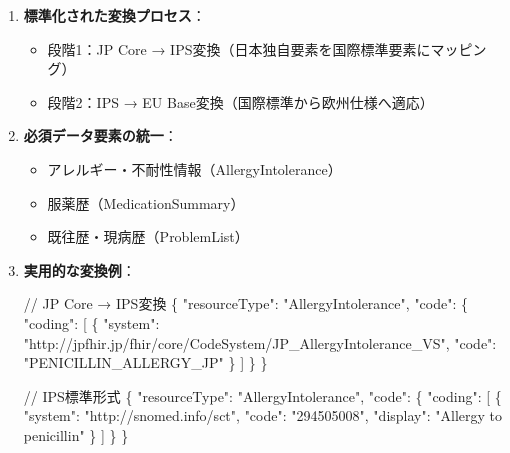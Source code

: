 \documentclass[
  a4paper,
  a4paper,
  11pt]{ltjsbook}
\newenvironment{Shaded}{\begin{snugshade}}{\end{snugshade}}
\newcommand{\DataTypeTok}[1]{\textcolor[rgb]{0.68,0.00,0.00}{#1}}
\newcommand{\ErrorTok}[1]{\textcolor[rgb]{0.68,0.00,0.00}{#1}}
\newcommand{\FunctionTok}[1]{\textcolor[rgb]{0.28,0.35,0.67}{#1}}
\newcommand{\OtherTok}[1]{\textcolor[rgb]{0.00,0.23,0.31}{#1}}
\newcommand{\StringTok}[1]{\textcolor[rgb]{0.13,0.47,0.30}{#1}}
\providecommand{\tightlist}{%
  \setlength{\itemsep}{0pt}\setlength{\parskip}{0pt}}
\begin{document}
\begin{enumerate}
\def\labelenumi{\arabic{enumi}.}
\item
  \textbf{標準化された変換プロセス}：

  \begin{itemize}
  \tightlist
  \item
    段階1：JP Core → IPS変換（日本独自要素を国際標準要素にマッピング）
  \item
    段階2：IPS → EU Base変換（国際標準から欧州仕様へ適応）
  \end{itemize}
\item
  \textbf{必須データ要素の統一}：

  \begin{itemize}
  \tightlist
  \item
    アレルギー・不耐性情報（AllergyIntolerance）
  \item
    服薬歴（MedicationSummary）
  \item
    既往歴・現病歴（ProblemList）
  \end{itemize}
\item
  \textbf{実用的な変換例}：

\begin{Shaded}
\begin{Highlighting}[]
\ErrorTok{//} \ErrorTok{JP} \ErrorTok{Core} \ErrorTok{→} \ErrorTok{IPS変換}
\FunctionTok{\{}
  \DataTypeTok{"resourceType"}\FunctionTok{:} \StringTok{"AllergyIntolerance"}\FunctionTok{,}
  \DataTypeTok{"code"}\FunctionTok{:} \FunctionTok{\{}
    \DataTypeTok{"coding"}\FunctionTok{:} \OtherTok{[}
      \FunctionTok{\{}
        \DataTypeTok{"system"}\FunctionTok{:} \StringTok{"http://jpfhir.jp/fhir/core/CodeSystem/JP\_AllergyIntolerance\_VS"}\FunctionTok{,}
        \DataTypeTok{"code"}\FunctionTok{:} \StringTok{"PENICILLIN\_ALLERGY\_JP"}
      \FunctionTok{\}}
    \OtherTok{]}
  \FunctionTok{\}}
\FunctionTok{\}}

\ErrorTok{//} \ErrorTok{IPS標準形式}
\FunctionTok{\{}
  \DataTypeTok{"resourceType"}\FunctionTok{:} \StringTok{"AllergyIntolerance"}\FunctionTok{,} 
  \DataTypeTok{"code"}\FunctionTok{:} \FunctionTok{\{}
    \DataTypeTok{"coding"}\FunctionTok{:} \OtherTok{[}
      \FunctionTok{\{}
        \DataTypeTok{"system"}\FunctionTok{:} \StringTok{"http://snomed.info/sct"}\FunctionTok{,}
        \DataTypeTok{"code"}\FunctionTok{:} \StringTok{"294505008"}\FunctionTok{,}
        \DataTypeTok{"display"}\FunctionTok{:} \StringTok{"Allergy to penicillin"}
      \FunctionTok{\}}
    \OtherTok{]}
  \FunctionTok{\}}
\FunctionTok{\}}
\end{Highlighting}
\end{Shaded}
\end{enumerate}
\end{document}
